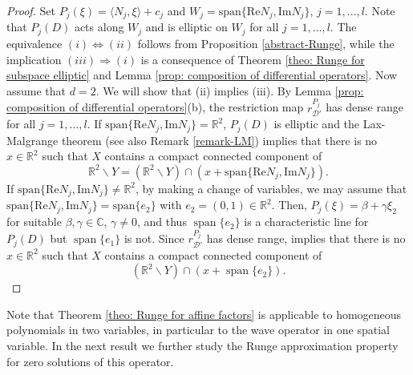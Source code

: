 \documentclass[12pt]{amsart}
\newcommand{\R}{\mathbb{R}}
\newcommand{\C}{\mathbb{C}}
\theoremstyle{definition}
\theoremstyle{remark}
\numberwithin{equation}{section}
\begin{document}
\begin{proof} Set $P_j(\xi)=\langle N_j,\xi\rangle+c_j$ and $W_j=\mbox{span}\{\mbox{Re}N_j, \mbox{Im}N_j\}$, $j=1,\ldots, l$. Note that $P_j(D)$ acts along $W_j$ and is elliptic on $W_j$ for all  $j=1,\ldots, l$. The equivalence $(i) \Leftrightarrow (ii)$ follows  from  Proposition \ref{abstract-Runge}, while  the implication $(iii) \Rightarrow (i)$ is a consequence of Theorem \ref{theo: Runge for subspace elliptic} and Lemma \ref{prop: composition of differential operators}. Now assume that $d=2$. We will show that (ii) implies (iii). By Lemma \ref{prop: composition of differential operators}(b), the restriction map $r_{\mathscr{D}'}^{P_j}$ has dense range for all $j=1,\ldots,l$. If $\mbox{span}\{\mbox{Re}N_j, \mbox{Im}N_j\}=\R^2$, $P_j(D)$ is elliptic and the Lax-Malgrange theorem (see also Remark \ref{remark-LM}) implies that there is no $x\in\R^2$ such that $X$ contains a compact connected component of
	$$
	 \R^2\backslash Y = \left(\R^2\backslash Y\right)\cap\left(x+\mbox{span}\{\mbox{Re}N_j, \mbox{Im}N_j\}\right).
	$$ 
	If $\mbox{span}\{\mbox{Re}N_j, \mbox{Im}N_j\}\neq\R^2$, by making a change of variables, we may assume that $\mbox{span}\{\mbox{Re}N_j, \mbox{Im}N_j\}=\mbox{span}\{e_2\}$ with $e_2=(0,1)\in\R^2$. Then, $P_j(\xi)=\beta+\gamma\xi_2$ for suitable $\beta,\gamma\in\C$, $\gamma\neq 0$, and thus $\operatorname{span}\{e_2\}$ is  a characteristic line for $P_j(D)$ but $\operatorname{span}\{e_1\}$ is not.  Since $r_{\mathscr{D}'}^{P_j}$ has dense range, \cite[Theorem 2]{Kalmes21} implies that there is no $x\in\R^2$ such that $X$ contains a compact connected component of
	$$\left(\R^2\backslash Y\right)\cap\left(x+\operatorname{span}\{e_2\}\right).$$
\end{proof}

Note that Theorem \ref{theo: Runge for affine factors} is applicable to homogeneous polynomials in two variables, in particular to the  wave operator in one spatial variable. In the next result we further study  the Runge approximation property for zero solutions of  this operator.
\end{document}
